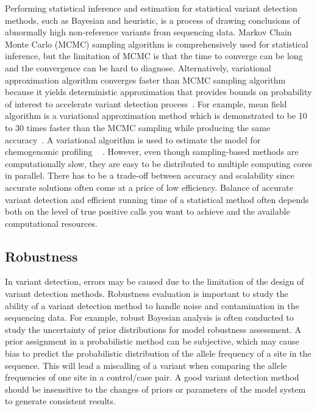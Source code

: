 \documentclass[a4,center,fleqn]{NAR}
\begin{document}
Performing statistical inference and estimation for statistical variant detection methods, such as Bayesian and heuristic, is a process of drawing conclusions of abnormally high non-reference variants from sequencing data. 
Markov Chain Monte Carlo (MCMC) sampling algorithm is comprehensively used for statistical inference, but the limitation of MCMC is that the time to converge can be long and the convergence can be hard to diagnose.
Alternatively, variational approximation algorithm converges faster than MCMC sampling algorithm because it yields deterministic approximation that provides bounds on probability of interest to accelerate variant detection process~\citep{jordan1999introduction}.
For example, mean field algorithm is a variational approximation method which is demonstrated to be 10 to 30 times faster than the MCMC sampling while producing the same accuracy~\citep{peterson1989explorations}.
A variational algorithm is used to estimate the model for chemogenomic profiling ~\citep{flaherty2005latent} .
However, even though sampling-based methods are computationally slow, they are easy to be distributed to multiple computing cores in parallel.
There has to be a trade-off between accuracy and scalability since accurate solutions often come at a price of low efficiency.
Balance of accurate variant detection and efficient running time of a statistical method often depends both on the level of true positive calls you want to achieve and the available computational resources.

\subsection{Robustness}

In variant detection, errors may be caused due to the limitation of the design of variant detection methods.
Robustness evaluation is important to study the ability of a variant detection method to handle noise and contamination in the sequencing data. 
For example, robust Bayesian analysis is often conducted to study the uncertainty of prior distributions for model robustness assessment.
A prior assignment in a probabilistic method can be subjective, which may cause bias to predict the probabilistic distribution of the allele frequency of a site in the sequence.
This will lead a miscalling of a variant when comparing the allele frequencies of one site in a control/case pair.
A good variant detection method should be insensitive to the changes of priors or parameters of the model system to generate consistent results.
\end{document}
